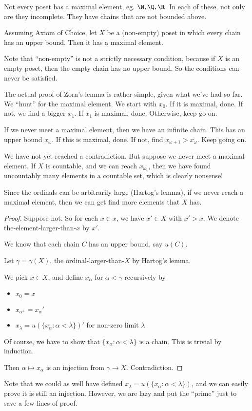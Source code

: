 \documentclass[a4paper]{article}
\begin{document}
Not every poset has a maximal element, eg. $\N, \Q, \R$. In each of these, not only are they incomplete. They have chains that are not bounded above.

\begin{thm}
  Assuming Axiom of Choice, let $X$ be a (non-empty) poset in which every chain has an upper bound. Then it has a maximal element.
\end{thm}
Note that ``non-empty'' is not a strictly necessary condition, because if $X$ is an empty poset, then the empty chain has no upper bound. So the conditions can never be satisfied.

The actual proof of Zorn's lemma is rather simple, given what we've had so far. We ``hunt'' for the maximal element. We start with $x_0$. If it is maximal, done. If not, we find a bigger $x_1$. If $x_1$ is maximal, done. Otherwise, keep go on.

If we never meet a maximal element, then we have an infinite chain. This has an upper bound $x_\omega$. If this is maximal, done. If not, find $x_{\omega + 1} > x_\omega$. Keep going on.

We have not yet reached a contradiction. But suppose we never meet a maximal element. If $X$ is countable, and we can reach $x_{\omega_1}$, then we have found uncountably many elements in a countable set, which is clearly nonsense!

Since the ordinals can be arbitrarily large (Hartog's lemma), if we never reach a maximal element, then we can get find more elements that $X$ has.

\begin{proof}
  Suppose not. So for each $x\in x$, we have $x'\in X$ with $x' > x$. We denote the-element-larger-than-$x$ by $x'$.

  We know that each chain $C$ has an upper bound, say $u(C)$.

  Let $\gamma = \gamma(X)$, the ordinal-larger-than-$X$ by Hartog's lemma.

  We pick $x\in X$, and define $x_\alpha$ for $\alpha < \gamma$ recursively by
  \begin{itemize}
    \item $x_0 = x$
    \item $x_{\alpha^+} = x_\alpha'$
    \item $x_{\lambda} = u(\{x_\alpha: \alpha < \lambda\})'$ for non-zero limit $\lambda$
  \end{itemize}
  Of course, we have to show that $\{x_\alpha: \alpha < \lambda\}$ is a chain. This is trivial by induction.

  Then $\alpha \mapsto x_\alpha$ is an injection from $\gamma\to X$. Contradiction.
\end{proof}
Note that we could as well have defined $x_\lambda = u(\{x_\alpha : \alpha < \lambda\})$, and we can easily prove it is still an injection. However, we are lazy and put the ``prime'' just to save a few lines of proof.
\end{document}
